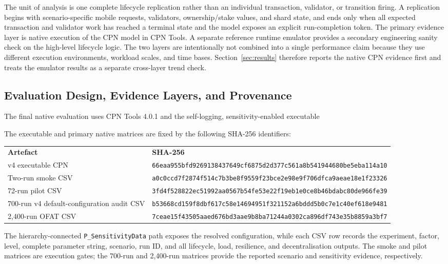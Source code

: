 \documentclass[a4paper,fleqn]{cas-sc}
\begin{document}
The unit of analysis is one complete lifecycle replication rather than an
individual transaction, validator, or transition firing. A replication begins
with scenario-specific mobile requests, validators, ownership/stake values, and
shard state, and ends only when all expected transaction and validator work has
reached a terminal state and the model exposes an explicit run-completion token.
The primary evidence layer is native execution of the CPN model in CPN Tools. A
separate reference runtime emulator provides a secondary engineering sanity
check on the high-level lifecycle logic. The two layers are intentionally not
combined into a single performance claim because they use different execution
environments, workload scales, and time bases. Section~\ref{sec:results}
therefore reports the native CPN evidence first and treats the emulator results
as a separate cross-layer trend check.

\subsection{Evaluation Design, Evidence Layers, and Provenance}
\label{subsec:evaluation_design}

The final native evaluation uses CPN Tools 4.0.1 and the self-logging,
sensitivity-enabled executable
\begin{center}
\small
\texttt{}
\end{center}
The executable and primary native matrices are fixed by the following SHA-256
identifiers:
\begin{center}
\scriptsize
\renewcommand{\arraystretch}{1.08}
\begin{tabular}{@{}ll@{}}
\textbf{Artefact} & \textbf{SHA-256} \\
v4 executable CPN & \texttt{66eaa955bfd9269138437649cf6875d2d377c561a8b541944680be5eba114a10} \\
Two-run smoke CSV & \texttt{a0c0ccd7f2874f514c7b3be8f9559f23bce2e98e9f706dfca9aeae18e1f23326} \\
72-run pilot CSV & \texttt{3fd4f528822ec51992aa0567b54fe53e22f19eb1e0ce8b46bdabc80de966fe39} \\
700-run v4 default-configuration audit CSV & \texttt{b53668cd159f8dbf617c58e14694951f321152a6bddd5b0c7e1c40ef618e9481} \\
2,400-run OFAT CSV & \texttt{7ceae15f43505aaed676bd3aae9b8ba71244a0302ca896df743e35b8859a3bf7} \\
\end{tabular}
\end{center}
The hierarchy-connected \texttt{P\_SensitivityData} path exposes the
resolved configuration, while each CSV row records the experiment, factor,
level, complete parameter string, scenario, run ID, and all lifecycle, load,
resilience, and decentralisation outputs. The smoke and pilot matrices are
execution gates; the 700-run and 2,400-run matrices provide the reported
scenario and sensitivity evidence, respectively.
\end{document}
